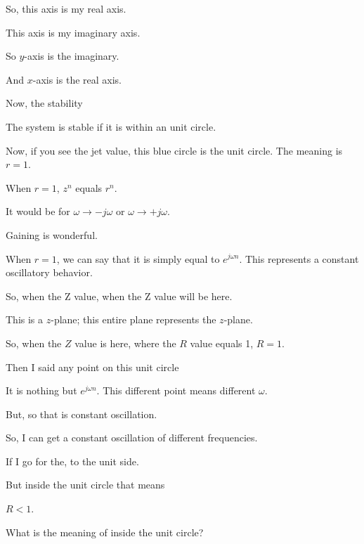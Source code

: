 \documentclass{article}
\begin{document}
So, this axis is my real axis.

This axis is my imaginary axis.

So $y$-axis is the imaginary.

And $x$-axis is the real axis.



Now, the stability

The system is stable if it is within an unit circle.



Now, if you see the jet value, this blue circle is the unit circle. The meaning is $r = 1$.



When $r = 1$, $z^n$ equals $r^n$.

It would be for $\omega \rightarrow -j\omega$ or $\omega \rightarrow +j\omega$.

Gaining is wonderful.



When $r = 1$, we can say that it is simply equal to $e^{j\omega n}$. This represents a constant oscillatory behavior.

So, when the Z value, when the Z value will be here.

This is a $z$-plane; this entire plane represents the $z$-plane.

So, when the $Z$ value is here, where the $R$ value equals 1, $R = 1$.

Then I said any point on this unit circle

It is nothing but $e^{j\omega n}$. This different point means different $\omega$.

But, so that is constant oscillation.

So, I can get a constant oscillation of different frequencies.

If I go for the, to the unit side.

But inside the unit circle that means

$R < 1$.

What is the meaning of inside the unit circle?
\end{document}
